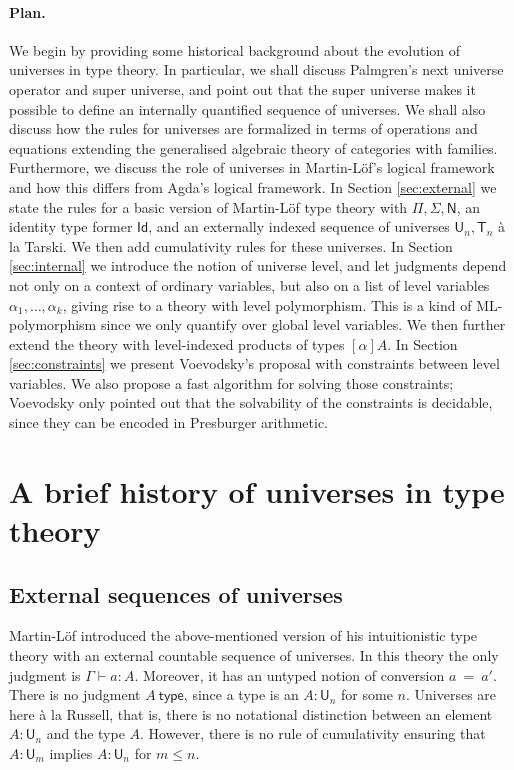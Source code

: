 \documentclass[11pt,a4paper]{article}
\newcommand{\Id}{\mathsf{Id}}
\newcommand{\conv}{=}
\def\NN{\mathsf{N}}
\def\UU{\mathsf{U}}
\newcommand{\type}{\mathsf{type}}
\newcommand{\T}{\mathsf{T}}
\begin{document}
\paragraph{Plan.} We begin by providing some historical background about the evolution of universes in type theory. In particular, we shall discuss Palmgren's next universe operator and super universe, and point out that the super universe makes it possible to define an internally quantified sequence of universes. We shall also discuss how the rules for universes are formalized in terms of operations and equations extending the generalised algebraic theory of categories with families. Furthermore, we discuss the role of universes in Martin-Löf's logical framework and how this differs from Agda's logical framework. In Section \ref{sec:external} we state the rules for a basic version of Martin-Löf type theory with $\Pi, \Sigma, \NN$, an identity type former $\Id$, and an externally indexed sequence of universes $\UU_n, \T_n$ \`a la Tarski. We then add cumulativity rules for these universes. In Section \ref{sec:internal} we introduce the notion of universe level, and let judgments depend not only on a context of ordinary variables, but also on a list of level variables $\alpha_1, \ldots, \alpha_k$, giving rise to a theory with level polymorphism. This is a kind of ML-polymorphism since we only quantify over global level variables. We then further extend the theory with level-indexed products of types $[\alpha]A$. In Section \ref{sec:constraints} we present Voevodsky's proposal with constraints between level variables. We also propose a fast algorithm for solving those constraints; Voevodsky only pointed out that the solvability of the constraints is decidable, since they can be encoded in Presburger arithmetic.

\section{A brief history of universes in type theory}\label{sec:history}

\subsection{External sequences of universes}\label{sec:palmgren}

Martin-Löf \cite{martinlof:predicative} introduced the above-mentioned version of his intuitionistic type theory with an external countable sequence of universes. In this theory the only judgment is  $\Gamma \vdash a : A$. Moreover, it has an untyped notion of conversion $a\ \conv\ a'$. There is no judgment $A\ \type$, since a type is an $A : \UU_n$ for some $n$. Universes are here \`a la Russell, that is, there is no notational distinction between an element $A : \UU_n$ and the type $A$. However, there is no rule of cumulativity ensuring that $A : \UU_m$ implies $A : \UU_n$ for $m \leq n$.
\end{document}
